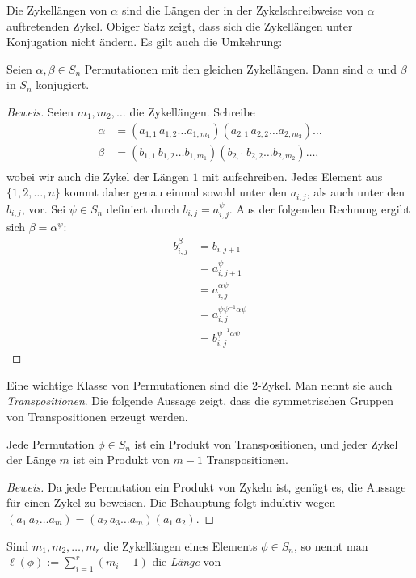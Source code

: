\documentclass[12pt,a4paper,twoside]{article}
\newcommand{\ei}[1]{\emph{#1}\index{#1}}
\begin{document}
Die Zykell\"angen von $\alpha$ sind die L\"angen der in der Zykelschreibweise
von $\alpha$ auftretenden Zykel. Obiger Satz zeigt, dass sich die Zykell\"angen
unter Konjugation nicht \"andern. Es gilt auch die Umkehrung:
\begin{Satz}\label{S:zykkon}
  Seien $\alpha,\beta\in S_n$ Permutationen mit den gleichen Zykell\"angen.
  Dann sind $\alpha$ und $\beta$ in $S_n$ konjugiert.
\end{Satz}
\begin{proof}[Beweis]
  Seien $m_1,m_2,\dots$ die Zykell\"angen. Schreibe
  \begin{align*}
    \alpha &=
    (a_{1,1}\,a_{1,2}\dots a_{1,m_1})(a_{2,1}\,a_{2,2}\dots a_{2,m_2})\dots\\
    \beta &=
    (b_{1,1}\,b_{1,2}\dots b_{1,m_1})(b_{2,1}\,b_{2,2}\dots b_{2,m_2})\dots,\\
\end{align*}
wobei wir auch die Zykel der L\"angen $1$ mit aufschreiben. Jedes Element aus
$\{1,2,\dots,n\}$ kommt daher genau einmal sowohl unter den $a_{i,j}$, als
auch unter den $b_{i,j}$, vor. Sei $\psi\in S_n$ definiert durch
$b_{i,j}=a_{i,j}^\psi$. Aus der folgenden Rechnung ergibt sich
$\beta=\alpha^\psi$:
\begin{align*}
  b_{i,j}^{\beta} &= b_{i,j+1}\\
&= a_{i,j+1}^\psi\\
&= a_{i,j}^{\alpha\psi}\\
&= a_{i,j}^{\psi\psi^{-1}\alpha\psi}\\
&= b_{i,j}^{\psi^{-1}\alpha\psi}
\end{align*}
\end{proof}
Eine wichtige Klasse von Permutationen sind die $2$-Zykel. Man nennt sie auch
\ei{Transpositionen}. Die folgende Aussage zeigt, dass die symmetrischen
Gruppen von Transpositionen erzeugt werden.
\begin{Satz}
  Jede Permutation $\phi\in S_n$ ist ein Produkt von
  Transpositionen, und jeder Zykel der L\"ange $m$ ist ein Produkt von $m-1$
  Transpositionen.
\end{Satz}
\begin{proof}[Beweis]
  Da jede Permutation ein Produkt von Zykeln ist, gen\"ugt es, die Aussage
  f\"ur einen Zykel zu beweisen. Die Behauptung folgt induktiv wegen
  $(a_1\,a_2\dots a_m)=(a_2\,a_3\dots a_m)(a_1\,a_2)$.
\end{proof}
Sind $m_1,m_2,\dots,m_r$ die Zykell\"angen eines Elements $\phi\in S_n$, so
nennt man $\ell(\phi):=\sum_{i=1}^r(m_i-1)$ die \ei{L\"ange} von
\end{document}
